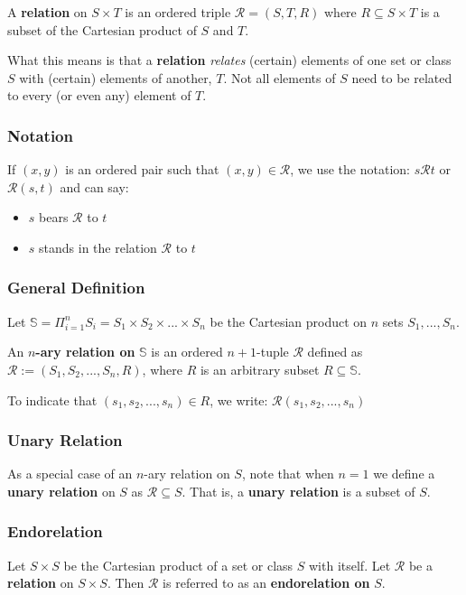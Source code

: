 A \textbf{relation} on $S \times T$ is an ordered triple
$ \mathcal{R} = (S, T, R) $ where $R \subseteq S \times T$ is a
subset of the Cartesian product of $S$ and $T$.

What this means is that a \textbf{relation} \textit{relates} (certain)
elements of one set or class $S$ with (certain) elements of another,
$T$. Not all elements of $S$ need to be related to every (or even any)
element of $T$.

\subsubsection{Notation}

If $(x, y)$ is an ordered pair such that $(x, y) \in \mathcal{R}$, we
use the notation: $ s \mathcal{R} t$ or $ \mathcal{R}(s, t)$ and can
say:
\begin{itemize}
\item $s$ bears $\mathcal{R}$ to $t$
\item $s$ stands in the relation $\mathcal{R}$ to $t$
\end{itemize}

\subsubsection{General Definition}
Let
$\mathbb{S} = \Pi^n_{i=1}S_i = S_1 \times S_2 \times ... \times S_n $
be the Cartesian product on $n$ sets $S_1, ..., S_n$.

An \textbf{$n$-ary relation on} $\mathbb{S}$ is an ordered
$n+1$-tuple $\mathcal{R}$ defined as
$\mathcal{R} := (S_1, S_2, ..., S_n, R)$, where $R$ is an arbitrary
subset $R \subseteq \mathbb{S}$.

To indicate that $(s_1, s_2, ..., s_n) \in R$, we
write: $\mathcal{R}(s_1, s_2, ..., s_n)$

\subsubsection{Unary Relation}
As a special case of an $n$-ary relation on $S$, note that when $n=1$
we define a \textbf{unary relation} on $S$ as
$\mathcal{R} \subseteq S$. That is, a \textbf{unary relation} is a
subset of $S$.

\subsubsection{Endorelation}
Let $S \times S$ be the Cartesian product of a set or class $S$ with
itself. Let $\mathcal{R}$ be a \textbf{relation} on $S \times S$. Then
$\mathcal{R}$ is referred to as an \textbf{endorelation on} $S$.


